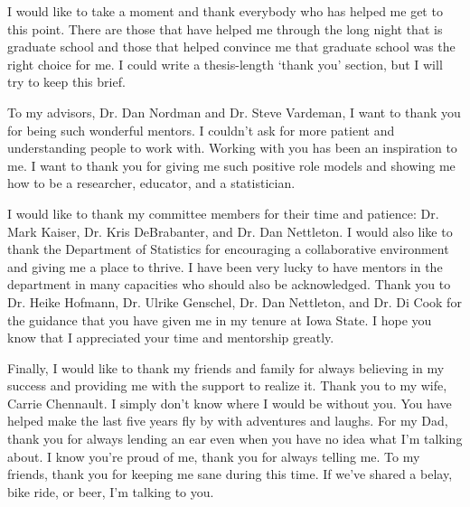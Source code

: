 
I would like to take a moment and thank everybody who has helped me get to this point. There are those that have helped me through the long night that is graduate school and those that helped convince me that graduate school was the right choice for me. I could write a thesis-length `thank you' section, but I will try to keep this brief.

To my advisors, Dr. Dan Nordman and Dr. Steve Vardeman, I want to thank you for being such wonderful mentors. I couldn't ask for more patient and understanding people to work with. Working with you has been an inspiration to me. I want to thank you for giving me such positive role models and showing me how to be a researcher, educator, and a statistician.

I would like to thank my committee members for their time and patience: Dr. Mark Kaiser, Dr. Kris DeBrabanter, and Dr. Dan Nettleton. I would also like to thank the Department of Statistics for encouraging a collaborative environment
and giving me a place to thrive. I have been very lucky to have mentors in the department in many capacities who should also be acknowledged. Thank you to Dr. Heike Hofmann, Dr. Ulrike Genschel, Dr. Dan Nettleton, and Dr. Di Cook for the guidance that you have given me in my tenure at Iowa State. I hope you know that I appreciated your time and mentorship greatly.

Finally, I would like to thank my friends and family for always believing in my success and providing me with the support to realize it. Thank you to my wife, Carrie Chennault. I simply don't know where I would be without you. You have helped make the last five years fly by with adventures and laughs. For my Dad, thank you for always lending an ear even when you have no idea what I'm talking about. I know you're proud of me, thank you for always telling me. To my friends, thank you for keeping me sane during this time. If we've shared a belay, bike ride, or beer, I'm talking to you.